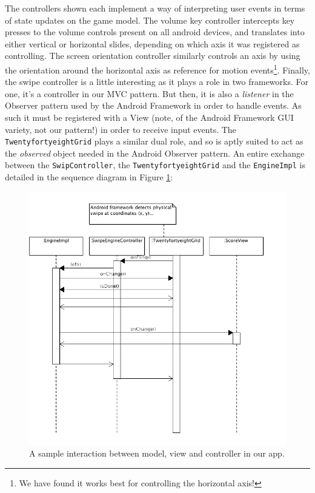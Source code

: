 \documentclass[a4paper, 12pt]{article}
\newcommand{\code}[1]{\texttt{#1}}
\begin{document}
The controllers shown each implement a way of interpreting user events
in terms of state updates on the game model. The volume key controller
intercepts key presses to the volume controls present on all android
devices, and translates into either vertical or horizontal slides,
depending on which axis it was registered as controlling. The screen
orientation controller similarly controls an axis by using the
orientation around the horizontal axis as reference for motion
events\footnote{We have found it works best for controlling the
  horizontal axis!}. Finally, the swipe controller is a little
interesting as it plays a role in two frameworks. For one, it's a
controller in our MVC pattern. But then, it is also a \emph{listener}
in the Observer pattern used by the Android Framework in order to
handle events. As such it must be registered with a View (note, of the
Android Framework GUI variety, not our pattern!) in order to receive
input events. The \code{TwentyfortyeightGrid} plays a similar dual
role, and so is aptly suited to act as the \emph{observed} object needed in
the Android Observer pattern. An entire exchange between the
\code{SwipController}, the \code{TwentyfortyeightGrid} and the
\code{EngineImpl} is detailed in the sequence diagram in Figure \ref{fig:seq-1.png}:

\begin{figure}[!h]
  \includegraphics[width=\linewidth]{seq-1.png}
  \caption{A sample interaction between model, view and controller in
    our app.}
  \label{fig:seq-1.png}
\end{figure}
\end{document}
